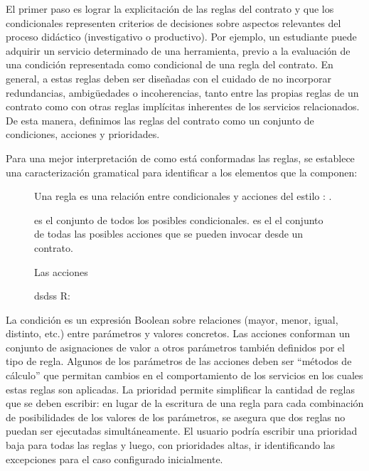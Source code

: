 \begin{itemize}
El primer paso es lograr la explicitación de las reglas del contrato y que los condicionales representen criterios de decisiones sobre aspectos relevantes del proceso didáctico (investigativo o productivo). Por ejemplo, un estudiante puede adquirir un servicio determinado de una herramienta, previo a la evaluación de una condición representada como condicional de una regla del contrato. En general, a estas reglas deben ser diseñadas con el cuidado de no incorporar
redundancias, ambigüedades o incoherencias, tanto entre las propias reglas de un contrato como con otras reglas implícitas inherentes de los servicios relacionados. De esta manera, definimos las reglas del contrato como un conjunto de condiciones, acciones y prioridades.

Para una mejor interpretación de como está conformadas las reglas, se establece una caracterización gramatical para identificar a los elementos que la componen:

\begin{center}
 

\begin{figure}


Una regla es una relación entre condicionales y acciones del estilo \Re:  \rightarrow {}. 

 es el conjunto de todos los posibles condicionales. 
 es el el conjunto de todas las posibles acciones que se pueden  invocar desde un contrato. 

Las acciones 

dsdss
R:

\label{fig:representación_reglas}
\end{figure}


\end{center}


La condición es un expresión Boolean sobre relaciones (mayor, menor,
igual, distinto, etc.) entre parámetros y valores concretos.
Las acciones conforman un conjunto de asignaciones de valor a otros parámetros
también definidos por el tipo de regla. Algunos de los parámetros de
las acciones deben ser “métodos de cálculo” que permitan cambios en el comportamiento
de los servicios en los cuales estas reglas son aplicadas.
La prioridad permite simplificar la cantidad de reglas que se deben escribir:
en lugar de la escritura de una regla para cada combinación de posibilidades
de los valores de los parámetros, se asegura que dos reglas no puedan ser
ejecutadas simultáneamente. El usuario podría escribir una prioridad baja para
todas las reglas y luego, con prioridades altas, ir identificando las excepciones
para el caso configurado inicialmente.


\end{itemize}
